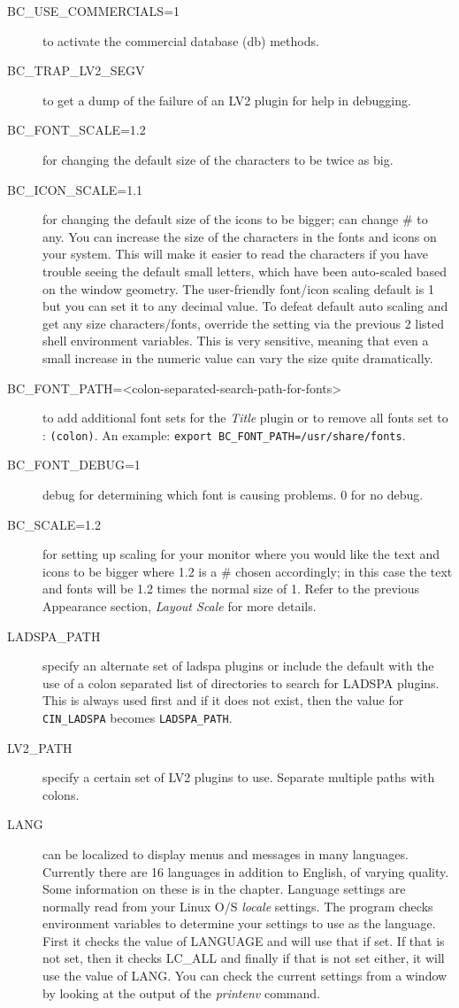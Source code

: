 \begin{description}
    \item[{\small BC\_USE\_COMMERCIALS=1}] to activate the commercial database (db) methods.
    \item[{\small BC\_TRAP\_LV2\_SEGV}] to get a dump of the failure of an LV2 plugin for help in debugging.
    \item[{\small BC\_FONT\_SCALE=1.2}] for changing the default size of the characters to be twice as big.
    \item[{\small BC\_ICON\_SCALE=1.1}] for changing the default size of the icons to be bigger; can change \# to any. You can increase the size of the characters in the fonts and icons on your \CGG{} system.  This will make it easier to read the characters if you have trouble seeing the default small letters, which have been auto-scaled based on the window geometry. The user-friendly font/icon scaling default is 1 but you can set it to any decimal value.  To defeat default auto scaling and get any size characters/fonts, override the setting via the previous 2 listed shell environment variables. This is very sensitive, meaning that even a small increase in the numeric value can vary the size quite dramatically.
    \item[{\small BC\_FONT\_PATH=<colon-separated-search-path-for-fonts>}]  to add additional font sets for the \textit{Title}
    plugin or to remove all fonts set to : \texttt{(colon)}.  An example: \texttt{export BC\_FONT\_PATH=/usr/share/fonts}.
    \item[{\small BC\_FONT\_DEBUG=1}] debug for determining which font is causing problems.  0 for no debug.
    \item[{\small BC\_SCALE=1.2}] for setting up scaling for your monitor where you would like the text and icons to be bigger where 1.2 is a \# chosen accordingly; in this case the text and fonts will be 1.2 times the
normal size of 1. Refer to the previous Appearance section, \textit{Layout Scale} for more details.
    \item[{\small LADSPA\_PATH}] specify an alternate set of ladspa plugins or include the default with the use of a colon separated list of directories to search for LADSPA plugins. This is always used first and if it does not
    exist, then the value for \texttt{CIN\_LADSPA} becomes \texttt{LADSPA\_PATH}.
    \item[{\small LV2\_PATH}] specify a certain set of LV2 plugins to use.  Separate multiple paths with colons.
    \item[{\small LANG}] \CGG{} can be localized to display menus and messages in many languages.
Currently there are 16 languages in addition to English, of varying quality. Some information on
these is in the  chapter.
Language settings are normally read from your Linux O/S \textit{locale} settings. 
The \CGG{} program checks environment variables to determine your settings to use as the language.
First it checks the value of LANGUAGE and will use that if set.
If that is not set, then it checks 
LC\_ALL and finally if that is not set either, it will use the value of LANG. You can check the current
settings from a window by looking at the output of the \textit{printenv} command.


\end{description}
